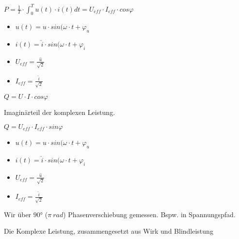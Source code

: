 \documentclass[letterpaper,10pt,english]{jupyterBook}
\begin{document}
\sphinxAtStartPar
\(P = \frac{1}{T}\cdot \int_0^T u(t)\cdot i(t) dt = U_{eff} \cdot I_{eff}\cdot cos\varphi\)
\begin{itemize}
\item {} 
\sphinxAtStartPar
\(u(t) = \hat{u}\cdot sin(\omega\cdot t + \varphi_u\)

\item {} 
\sphinxAtStartPar
\(i(t) = \hat{i}\cdot sin(\omega\cdot t + \varphi_i\)

\item {} 
\sphinxAtStartPar
\(U_{eff} = \frac{\hat{u}}{\sqrt{2}}\)

\item {} 
\sphinxAtStartPar
\(I_{eff} = \frac{\hat{i}}{\sqrt{2}}\)

\end{itemize}

\begin{DUlineblock}{0em}
\item[] 
\end{DUlineblock}

\sphinxAtStartPar
\(Q = U\cdot I \cdot cos \varphi\)

\sphinxAtStartPar
Imaginärteil der komplexen Leistung.

\sphinxAtStartPar
\(Q = U_{eff} \cdot I_{eff}\cdot sin\varphi\)
\begin{itemize}
\item {} 
\sphinxAtStartPar
\(u(t) = \hat{u}\cdot sin(\omega\cdot t + \varphi_u\)

\item {} 
\sphinxAtStartPar
\(i(t) = \hat{i}\cdot sin(\omega\cdot t + \varphi_i\)

\item {} 
\sphinxAtStartPar
\(U_{eff} = \frac{\hat{u}}{\sqrt{2}}\)

\item {} 
\sphinxAtStartPar
\(I_{eff} = \frac{\hat{i}}{\sqrt{2}}\)

\end{itemize}

\sphinxAtStartPar
Wir über \(90°\) (\(\pi~rad\)) Phasenverschiebung gemessen.
Bspw. in Spannungspfad.

\begin{DUlineblock}{0em}
\item[] 
\end{DUlineblock}

\sphinxAtStartPar
Die Komplexe Leistung, zusammengesetzt aus Wirk\sphinxhyphen{} und Blindleistung
\end{document}
